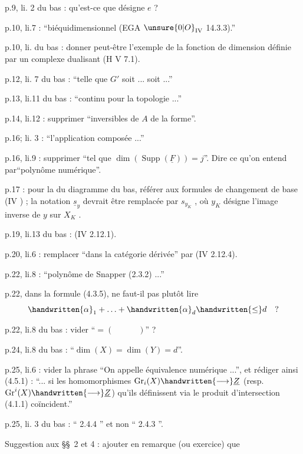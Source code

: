 
p.9, li. 2 du bas : qu'est-ce que désigne $e$ ?

p.10, li.7 : ``biéquidimensionnel (EGA $\unsure{0|O}_{\mathrm{IV}}$ 14.3.3).''

p.10, li. du bas : donner peut-être l'exemple de la fonction de dimension définie par un complexe dualisant (\handwritten{[}H\handwritten{]} V 7.1).

p.12, li. 7 du bas : ``telle que $G'$ soit ... soit ...''

p.13, li.11 du bas : ``continu pour la topologie ...''

p.14, li.12 : supprimer ``inversibles de $A$ de la forme''.

p.16; li. 3 : ``l'application composée ...''

p.16, li.9 : supprimer ``tel que $\dim(\operatorname{Supp}(\underline{F}))=j$''. Dire ce qu'on entend par``polynôme numérique''.

p.17 : pour la  du diagramme du bas, référer aux formules de changement de base (IV \hspace{3em}) ; la notation $\underline{s}_y$ devrait être remplacée par $s_{y_K}$ , où $y_K$ désigne l'image inverse de $y$ sur $X_K$ .

p.19, li.13 du bas : (IV 2.12.1).

p.20, li.6 : remplacer ``dans la catégorie dérivée'' par (IV 2.12.4).

p.22, li.8 : ``polynôme de Snapper (2.3.2) ...''

p.22, dans la formule (4.3.5), ne faut-il pas plutôt lire
\[
\handwritten{\alpha}_1+\ldots+\handwritten{\alpha}_d\handwritten{\leq}d\quad ?
\]


p.22, li.8 du bas : vider ``$=(\hspace{3em})$'' ?

p.24, li.8 du bas : ``$\dim(X)=\dim(Y)=d$''.

p.25, li.6 : vider la phrase ``On appelle équivalence numérique ...'', et rédiger ainsi (4.5.1) : ``... si les homomorphismes $\operatorname{Gr}_i(X)\handwritten{\longrightarrow}\underline{Z}$ (resp. $\operatorname{Gr}^i(X)\handwritten{\longrightarrow}\underline{Z}$) qu'ils définissent via le produit d'intersection (4.1.1) coïncident.''

p.25, li. 3 du bas : `` 2.4.4 '' et non `` 2.4.3 ''.

Suggestion aux \S\S\ 2 et 4 : ajouter en remarque (ou exercice) que
